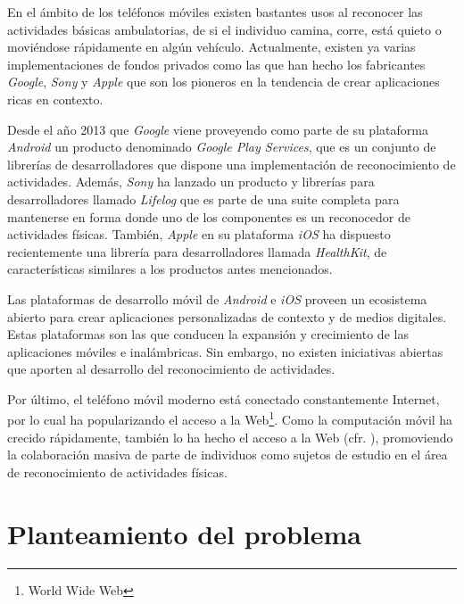 En el ámbito de los teléfonos móviles existen bastantes usos al reconocer
las actividades básicas ambulatorias, de si el individuo camina, corre,
está quieto o moviéndose rápidamente en algún vehículo\cite{campuzano2015}\cite{googlio2013}.
Actualmente, existen ya varias implementaciones de fondos privados
como las que han hecho los fabricantes \emph{Google}, \emph{Sony}
y \emph{Apple} que son los pioneros en la tendencia de crear aplicaciones
ricas en contexto.

Desde el año 2013 que \emph{Google} viene proveyendo como parte de
su plataforma \emph{Android}\cite{google2005and}
un producto denominado \emph{Google Play Services}\cite{googl2016loc},
que es un conjunto de librerías de desarrolladores que dispone una
implementación de reconocimiento de actividades. Además, \emph{Sony}
ha lanzado un producto y librerías para desarrolladores llamado \emph{Lifelog}\cite{sony2016act}
que es parte de una suite completa para mantenerse en forma donde
uno de los componentes es un reconocedor de actividades físicas. También,
\emph{Apple} en su plataforma \emph{iOS}\cite{apple2007ios}
ha dispuesto recientemente una librería para desarrolladores llamada
\emph{HealthKit}\cite{healthkit2016}, de características similares
a los productos antes mencionados. 

Las plataformas de desarrollo móvil de \emph{Android} e \emph{iOS
}proveen un ecosistema abierto para crear aplicaciones personalizadas
de contexto y de medios digitales. Estas plataformas son las que conducen
la expansión y crecimiento de las aplicaciones móviles e inalámbricas\cite{Tanenbaum2010}.
Sin embargo, no existen iniciativas abiertas que aporten al desarrollo
del reconocimiento de actividades.

Por último, el teléfono móvil moderno está conectado constantemente
Internet, por lo cual ha popularizando el acceso a la Web\footnote{World Wide Web}.
Como la computación móvil ha crecido rápidamente, también lo ha hecho
el acceso a la Web (cfr. \cite{nyt2008iph}), promoviendo la colaboración
masiva de parte de individuos como sujetos de estudio en el área de
reconocimiento de actividades físicas.

\section{Planteamiento del problema}

